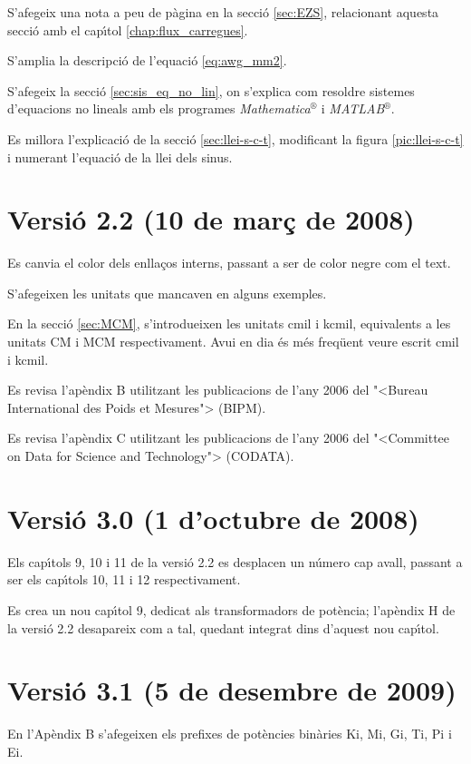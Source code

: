 S'afegeix una nota a peu de p\`{a}gina en la secci\'{o} \ref{sec:EZS}, relacionant aquesta secci\'{o} amb el cap\'{\i}tol \ref{chap:flux_carregues}.

S'amplia la descripci\'{o} de l'equaci\'{o} \eqref{eq:awg_mm2}.

S'afegeix la secci\'{o} \ref{sec:sis_eq_no_lin}, on s'explica com resoldre sistemes d'equacions no lineals amb els programes \textit{Mathematica}${}^\circledR$ i \textit{MATLAB}${}^\circledR$.

Es millora l'explicaci\'{o} de la secci\'{o} \ref{sec:llei-s-c-t}, modificant la figura \ref{pic:llei-s-c-t} i numerant l'equaci\'{o} de la llei dels sinus.

\section*{Versi\'{o} 2.2 (10 de mar\c{c} de 2008)}

Es canvia el color dels enlla\c{c}os interns, passant a ser de color negre com el text.

S'afegeixen les unitats que mancaven en alguns exemples.

En la secci\'{o} \ref{sec:MCM}, s'introdueixen les unitats cmil i kcmil, equivalents a les unitats CM i MCM respectivament. Avui en dia \'{e}s m\'{e}s freq\"{u}ent veure escrit cmil i kcmil.

Es revisa l'ap\`{e}ndix B utilitzant les publicacions de l'any 2006 del {"<}Bureau
International des Poids et Mesures{">} (\textsf{BIPM}).

Es revisa l'ap\`{e}ndix C utilitzant les publicacions de l'any 2006 del {"<}Committee on Data for Science and Technology{">} (\textsf{CODATA}).

\section*{Versi\'{o} 3.0 (1 d'octubre de 2008)}

Els cap\'{\i}tols 9, 10 i 11 de la versi\'{o} 2.2 es desplacen un n\'{u}mero cap
avall, passant a ser els cap\'{\i}tols 10, 11 i 12 respectivament.

Es crea un nou cap\'{\i}tol 9, dedicat als transformadors de pot\`{e}ncia;
l'ap\`{e}ndix H de la versi\'{o} 2.2 desapareix com a tal, quedant integrat
dins d'aquest nou cap\'{\i}tol.


\section*{Versi\'{o} 3.1 (5 de desembre de 2009)}
En l'Ap\`{e}ndix B s'afegeixen els prefixes de pot\`{e}ncies bin\`{a}ries Ki, Mi, Gi, Ti, Pi i Ei.

